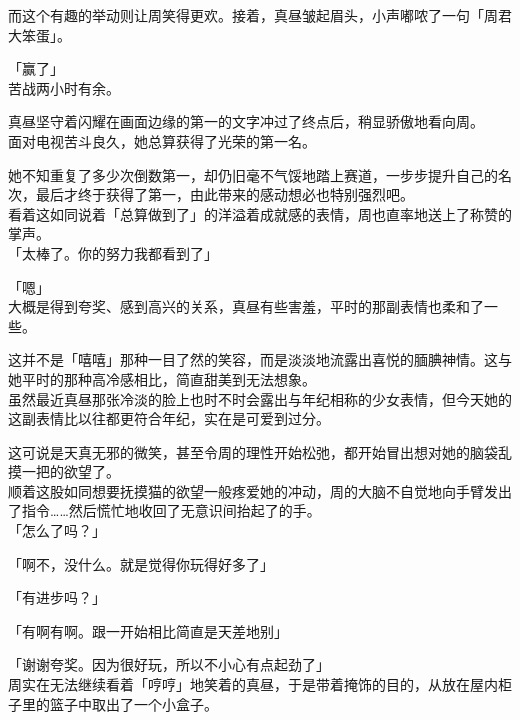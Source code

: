 而这个有趣的举动则让周笑得更欢。接着，真昼皱起眉头，小声嘟哝了一句「周君大笨蛋」。\\

\vspace{2\baselineskip}

「赢了」\\

苦战两小时有余。

真昼坚守着闪耀在画面边缘的第一的文字冲过了终点后，稍显骄傲地看向周。\\

面对电视苦斗良久，她总算获得了光荣的第一名。

她不知重复了多少次倒数第一，却仍旧毫不气馁地踏上赛道，一步步提升自己的名次，最后才终于获得了第一，由此带来的感动想必也特别强烈吧。\\

看着这如同说着「总算做到了」的洋溢着成就感的表情，周也直率地送上了称赞的掌声。\\

「太棒了。你的努力我都看到了」

「嗯」\\

大概是得到夸奖、感到高兴的关系，真昼有些害羞，平时的那副表情也柔和了一些。

这并不是「嘻嘻」那种一目了然的笑容，而是淡淡地流露出喜悦的腼腆神情。这与她平时的那种高冷感相比，简直甜美到无法想象。\\

虽然最近真昼那张冷淡的脸上也时不时会露出与年纪相称的少女表情，但今天她的这副表情比以往都更符合年纪，实在是可爱到过分。

这可说是天真无邪的微笑，甚至令周的理性开始松弛，都开始冒出想对她的脑袋乱摸一把的欲望了。\\

顺着这股如同想要抚摸猫的欲望一般疼爱她的冲动，周的大脑不自觉地向手臂发出了指令……然后慌忙地收回了无意识间抬起了的手。\\

「怎么了吗？」

「啊不，没什么。就是觉得你玩得好多了」

「有进步吗？」

「有啊有啊。跟一开始相比简直是天差地别」

「谢谢夸奖。因为很好玩，所以不小心有点起劲了」\\

周实在无法继续看着「哼哼」地笑着的真昼，于是带着掩饰的目的，从放在屋内柜子里的篮子中取出了一个小盒子。\\

